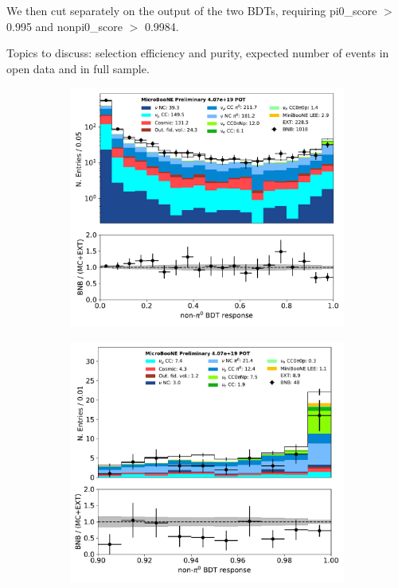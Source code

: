 \documentclass[a4paper]{article}
\begin{document}
We then cut separately on the output of the two BDTs, requiring pi0\_score $>$ 0.995 and nonpi0\_score $>$ 0.9984.

\par 
Topics to discuss: selection efficiency and purity, expected number of events in open data and in full sample.

\begin{figure}[H] 
\begin{center}
    \begin{subfigure}[b]{0.45\textwidth}
    \centering
    \includegraphics[width=1.00\textwidth]{1eNp/nonpi0_score_01162020_RUN1.pdf}
    \caption{\label{fig:1eNp:bdt:nonpi0:all}}
    \end{subfigure}
    \begin{subfigure}[b]{0.45\textwidth}
    \centering
    \includegraphics[width=1.00\textwidth]{1eNp/nonpi0_score_zoom_01162020_RUN1.pdf}

\end{subfigure}
\end{center}
\end{figure}
\end{document}
